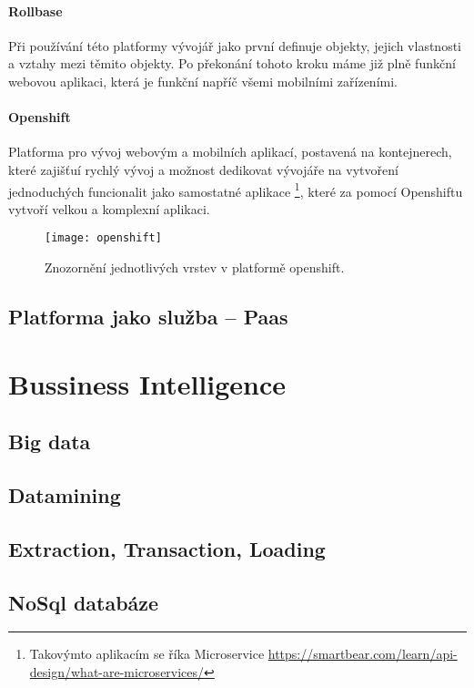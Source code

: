 \paragraph{Rollbase} Při používání této platformy vývojář jako první definuje objekty, jejich vlastnosti a vztahy mezi těmito objekty. Po překonání tohoto kroku máme již plně funkční webovou aplikaci, která je funkční napříč všemi mobilními zařízeními. \cite{what-is-low-code}
\paragraph{Openshift} Platforma pro vývoj webovým a mobilních aplikací, postavená na kontejnerech, které zajišťuí rychlý vývoj a možnost dedikovat vývojáře na vytvoření jednoduchých funcionalit jako samostatné aplikace \footnote{Takovýmto aplikacím se říka Microservice \url{https://smartbear.com/learn/api-design/what-are-microservices/}}, které za pomocí Openshiftu vytvoří velkou a komplexní aplikaci.\cite{openshift-overview}
\begin{figure}[h]
\centering
\texttt{[image: openshift]}
\caption{Znozornění jednotlivých vrstev v platformě openshift.}
\end{figure}

\subsection{Platforma jako služba -- Paas}

\section{Bussiness Intelligence}

\subsection{Big data}

\subsection{Datamining}

\subsection{Extraction, Transaction, Loading}

\subsection{NoSql databáze}
\cite{nosql}

